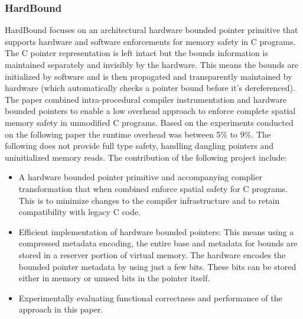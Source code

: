 \subsubsection{HardBound}
HardBound\cite{Hardbound} focuses on an architectural hardware bounded pointer primitive 
that supports hardware and software enforcements for memory safety in C programs. 
The C pointer representation is left intact but the bounds information is maintained 
separately and invisibly by the hardware. This means the bounds are initialized by 
software and is then propagated and transparently maintained by hardware (which automatically 
checks a pointer bound before it's dereferenced). The paper combined intra-procedural compiler 
instrumentation and hardware bounded pointers to enable a low overhead approach to enforce 
complete spatial memory safety in unmodified C programs. Based on the experiments conducted 
on the following paper the runtime overhead was between 5\% to 9\%. The following does not provide 
full type safety, handling dangling pointers and uninitialized memory reads.
The contribution of the following project include: 
\begin{itemize}
  \item A hardware bounded pointer primitive and accompanying complier transformation 
  that when combined enforce spatial safety for C programs. This is to minimize changes 
  to the compiler infrastructure and to retain compatibility with legacy C code. 
  \item Efficient implementation of hardware bounded pointers: This means using a compressed 
  metadata encoding, the entire base and metadata for bounds are stored in a reserver portion 
  of virtual memory. The hardware encodes the bounded pointer metadata by using just a few bits.
  These bits can be stored either in memory or unused bits in the pointer itself.
  \item Experimentally evaluating functional correctness and performance of the approach 
  in this paper.
\end{itemize}





